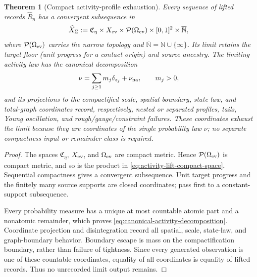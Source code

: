 \documentclass[11pt]{article}
\numberwithin{section}{part}
\theoremstyle{plain}
\newtheorem{theorem}{Theorem}[section]
\theoremstyle{definition}
\theoremstyle{remark}
\begin{document}
\begin{theorem}[Compact activity-profile exhaustion]
\label{thm:target-complete-concentration-exhaustion}
Every sequence of lifted records \(\widehat R_n\) has a convergent subsequence
in
\begin{equation}
 \label{eq:activity-lift-compact-space}
 \widehat X_\Sigma
 :=\mathfrak C_\eta\times X_{\rm ev}\times\mathcal P(\Omega_{\rm ev})
   \times[0,1]^2\times\overline{\mathbb N},
\end{equation}
where \(\mathcal P(\Omega_{\rm ev})\) carries the narrow topology and
\(\overline{\mathbb N}=\mathbb N\cup\{\infty\}\).  Its limit retains the
target floor (unit progress for a contact origin) and source ancestry.  The limiting activity law has the
canonical decomposition
\begin{equation}
 \label{eq:canonical-activity-decomposition}
 \nu=\sum_{j\ge1}m_j\delta_{z_j}
      +\nu_{\rm na},
 \qquad m_j>0,
\end{equation}
and its projections to the compactified scale, spatial-boundary, state-law,
and total-graph coordinates record, respectively, nested or separated
profiles, tails, Young oscillation, and rough/gauge/constraint failures.
These coordinates exhaust the limit because they are coordinates of the
single probability law \(\nu\); no separate compactness input or
remainder class is required.
\end{theorem}

\begin{proof}
The spaces \(\mathfrak C_\eta\), \(X_{\rm ev}\), and
\(\Omega_{\rm ev}\) are compact metric.  Hence
\(\mathcal P(\Omega_{\rm ev})\) is compact metric, and so is the product in
\eqref{eq:activity-lift-compact-space}.  Sequential compactness gives a
convergent subsequence.  Unit target progress and the finitely many source
supports are closed coordinates; pass first to a constant-support subsequence.

Every probability measure has a unique at most countable atomic part and a
nonatomic remainder, which proves \eqref{eq:canonical-activity-decomposition}.
Coordinate projection and disintegration record all spatial, scale, state-law,
and graph-boundary behavior.  Boundary escape is mass on the compactification
boundary, rather than failure of tightness.  Since every generated observation
is one of these countable coordinates, equality of all coordinates is equality
of lifted records.  Thus no unrecorded limit output remains.
\end{proof}
\end{document}
